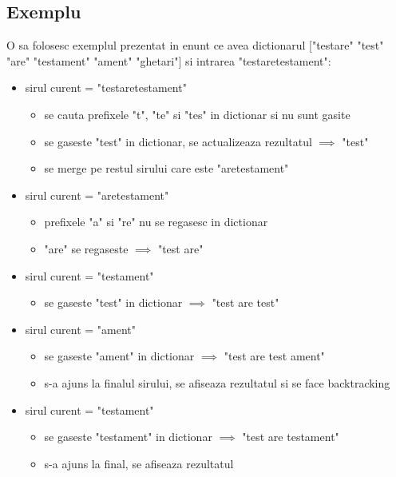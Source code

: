 \documentclass[runningheads]{llncs}
\begin{document}
\subsection{Exemplu}
O sa folosesc exemplul prezentat in enunt ce avea dictionarul ["testare" "test" "are" "testament" "ament" "ghetari"] si intrarea
"testaretestament":
\begin{itemize}
	\setlength\itemsep{1em}
	\item sirul curent = "testaretestament"
	\begin{itemize}
		\setlength\itemsep{0em}
		\item se cauta prefixele "t", "te" si "tes" in dictionar si nu sunt gasite
		\item se gaseste "test" in dictionar, se actualizeaza rezultatul $\implies$ "test"
		\item se merge pe restul sirului care este "aretestament"
	\end{itemize}

	\item sirul curent = "aretestament"
	\begin{itemize}
		\setlength\itemsep{0em}
		\item prefixele "a" si "re" nu se regasesc in dictionar
		\item "are" se regaseste $\implies$ "test are"
	\end{itemize}

	\item sirul curent = "testament"
	\begin{itemize}
		\setlength\itemsep{0em}
		\item se gaseste "test" in dictionar $\implies$ "test are test"
	\end{itemize}

	\item sirul curent = "ament"
	\begin{itemize}
		\setlength\itemsep{0em}
		\item se gaseste "ament" in dictionar $\implies$ "test are test ament"
		\item s-a ajuns la finalul sirului, se afiseaza rezultatul si se face backtracking
	\end{itemize}

	\item sirul curent = "testament"
	\begin{itemize}
		\setlength\itemsep{0em}
		\item se gaseste "testament" in dictionar $\implies$ "test are testament"
		\item s-a ajuns la final, se afiseaza rezultatul
	\end{itemize}
	

\end{itemize}
\end{document}
